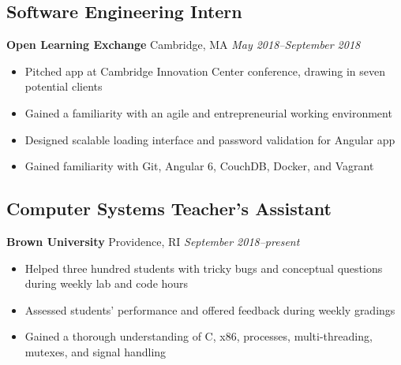 \documentclass[11pt]{article}
\begin{document}
\subsection{Software Engineering Intern} 
\textbf{Open Learning Exchange} Cambridge, MA \hfill \textit{May 2018--September 2018}
\begin{itemize}
	\item Pitched app at Cambridge Innovation Center conference, drawing in seven potential clients
	\item Gained a familiarity with an agile and entrepreneurial working environment
	\item Designed scalable loading interface and password validation for Angular app
	\item Gained familiarity with Git, Angular 6, CouchDB, Docker, and Vagrant
\end{itemize}

\subsection{Computer Systems Teacher's Assistant}
\textbf{Brown University} Providence, RI \hfill \textit{September 2018--present}

\begin{itemize}
	\item Helped three hundred students with tricky bugs and conceptual questions during weekly lab and code hours
	\item Assessed students' performance and offered feedback during weekly gradings
	\item Gained a thorough understanding of C, x86, processes, multi-threading, mutexes, and signal handling
\end{itemize}

\end{document}
